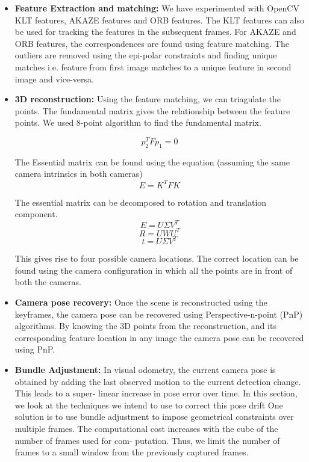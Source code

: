 \documentclass[12pt,twocolumn,letterpaper]{article}
\begin{document}
\begin{itemize}
\item \textbf{Feature Extraction and matching: } We have experimented with OpenCV KLT features, AKAZE features and ORB features. The KLT features can also be used for tracking the features in the subsequent frames. For AKAZE and ORB features, the correspondences are found using feature matching. The outliers are removed using the epi-polar constraints and finding unique matches i.e. feature from first image matches to a unique feature in second image and vice-versa.

\item \textbf{3D reconstruction: } Using the feature matching, we can triagulate the points. The fundamental matrix gives the relationship between the feature points. We used 8-point algorithm to find the fundamental matrix.

$$ p_2^T F p_1 = 0 $$

The Essential matrix can be found using the equation (assuming the same camera intrinsics in both cameras)
$$ E = K^T F K $$

The essential matrix can be decomposed to rotation and translation component.
$$ E = U\Sigma V^T $$
$$ R = U W U^T $$
$$ t = U \Sigma V^T $$

This gives rise to four possible camera locations. The correct location can be found using the camera configuration in which all the points are in front of both the cameras.

\item \textbf{Camera pose recovery: } Once the scene is reconstructed using the keyframes, the camera pose can be recovered using Perspective-n-point (PnP) algorithms. By knowing the 3D points from the reconstruction, and its corresponding feature location in any image the camera pose can be recovered using PnP.

\item \textbf{Bundle Adjustment: } In visual odometry, the current camera pose is
obtained by adding the last observed motion to the
current detection change. This leads to a super-
linear increase in pose error over time. In this
section, we look at the techniques we intend to
use to correct this pose drift
One solution is to use bundle adjustment to impose geometrical constraints over multiple
frames. The computational cost increases with
the cube of the number of frames used for com-
putation. Thus, we limit the number of frames
to a small window from the previously captured
frames.

\end{itemize}
\end{document}
